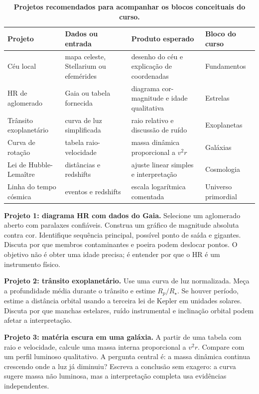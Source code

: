 \documentclass[11pt,a4paper]{article}
\begin{document}
\begin{longtable}{>{\raggedright\arraybackslash}p{3.2cm}>{\raggedright\arraybackslash}p{4.2cm}>{\raggedright\arraybackslash}p{4.6cm}>{\raggedright\arraybackslash}p{2.5cm}}
\caption{\textbf{Projetos recomendados para acompanhar os blocos conceituais do curso.}}\\
\toprule
Projeto & Dados ou entrada & Produto esperado & Bloco do curso \\
\midrule
Céu local & mapa celeste, Stellarium ou efemérides & desenho do céu e explicação de coordenadas & Fundamentos \\
HR de aglomerado & Gaia ou tabela fornecida & diagrama cor-magnitude e idade qualitativa & Estrelas \\
Trânsito exoplanetário & curva de luz simplificada & raio relativo e discussão de ruído & Exoplanetas \\
Curva de rotação & tabela raio-velocidade & massa dinâmica proporcional a $v^2r$ & Galáxias \\
Lei de Hubble-Lemaître & distâncias e redshifts & ajuste linear simples e interpretação & Cosmologia \\
Linha do tempo cósmica & eventos e redshifts & escala logarítmica comentada & Universo primordial \\
\bottomrule
\end{longtable}

\textbf{Projeto 1: diagrama HR com dados do Gaia.} Selecione um aglomerado aberto com paralaxes confiáveis. Construa um gráfico de magnitude absoluta contra cor. Identifique sequência principal, possível ponto de saída e gigantes. Discuta por que membros contaminantes e poeira podem deslocar pontos. O objetivo não é obter uma idade precisa; é entender por que o HR é um instrumento físico.

\textbf{Projeto 2: trânsito exoplanetário.} Use uma curva de luz normalizada. Meça a profundidade média durante o trânsito e estime $R_p/R_\star$. Se houver período, estime a distância orbital usando a terceira lei de Kepler em unidades solares. Discuta por que manchas estelares, ruído instrumental e inclinação orbital podem afetar a interpretação.

\textbf{Projeto 3: matéria escura em uma galáxia.} A partir de uma tabela com raio e velocidade, calcule uma massa interna proporcional a $v^2r$. Compare com um perfil luminoso qualitativo. A pergunta central é: a massa dinâmica continua crescendo onde a luz já diminuiu? Escreva a conclusão sem exagero: a curva sugere massa não luminosa, mas a interpretação completa usa evidências independentes.
\end{document}
